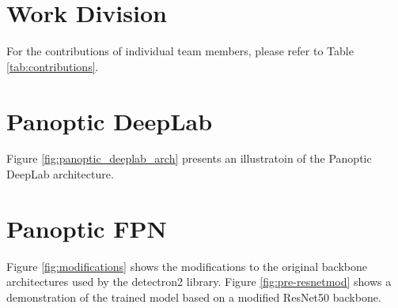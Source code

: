 \documentclass[10pt,twocolumn,letterpaper]{article}
\begin{document}





\section{Work Division}

For the contributions of individual team members, please refer to Table \ref{tab:contributions}.

\newpage
\newpage

{\small


}

\newpage

\appendix
\section{Panoptic DeepLab}

Figure \ref{fig:panoptic_deeplab_arch} presents an illustratoin of the Panoptic DeepLab architecture. 


\begin{figure*}[htbp]
\centering
{}
\caption{Panoptic DeepLab architecture}
\label{fig:panoptic_deeplab_arch}
\end{figure*}


\section{Panoptic FPN}
\label{app:fpn}

Figure \ref{fig:modifications} shows the modifications to the original backbone architectures used by the detectron2 library. Figure \ref{fig:pre-resnetmod} shows a demonstration of the trained model based on a modified ResNet50 backbone. 

\begin{figure*}[htbp]
\centering
{}
\caption{Modifications to the backbones of a Panoptic FPN architecture}
\label{fig:modifications}
\end{figure*}
\end{document}
